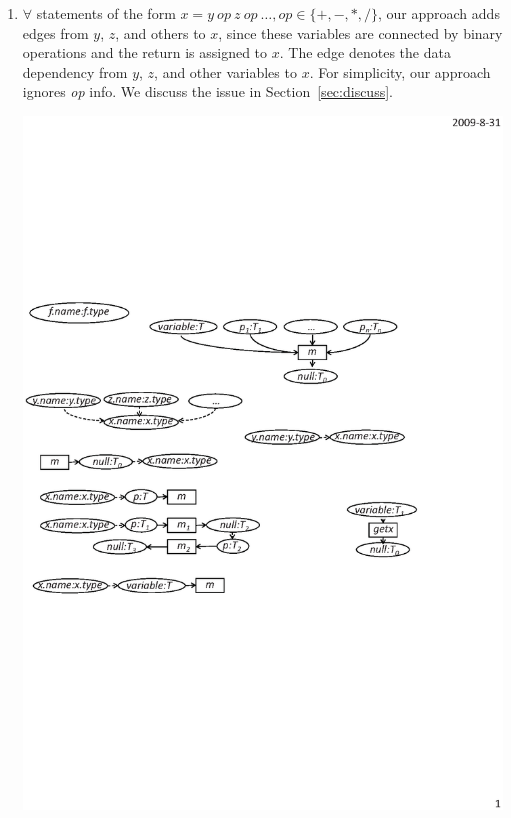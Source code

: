 \begin{enumerate}
\item $\forall$ statements of the form $ x = y\ op\ z\ op\ \ldots, op \in \{+,-,*,/\}$,
our approach adds edges from $y$, $z$, and others to $x$, since these
variables are connected by binary operations and the return is
assigned to $x$. The edge denotes the data dependency from $y$, $z$,
and other variables to $x$. For simplicity, our approach ignores
\emph{op} info. We discuss the issue in
Section~\ref{sec:discuss}.\vspace*{-1.5ex}
\begin{center}
\includegraphics[scale=0.7,clip]{figure/rule9.eps}%
\end{center}\vspace*{-2ex}
\end{enumerate}

